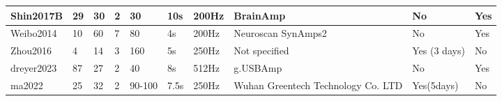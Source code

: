 \documentclass{ieeeaccess}
\begin{document}
\begin{landscape}
\begin{table}[tb]
\begin{tabularx}{\linewidth}{|p{2.5cm}|X|X|X|X|X|X|X|X|X|}
        Shin2017B\cite{shin2016open} & 29 & 30 & 2 & 30 & 10s & 200Hz & BrainAmp & No & Yes \\ \hline
        Weibo2014\cite{yi2014evaluation} & 10 & 60 & 7 & 80 & 4s & 200Hz & Neuroscan SynAmps2 & No & Yes \\ \hline
        Zhou2016\cite{zhou2016fully} & 4 & 14 & 3 & 160 & 5s & 250Hz & Not specified & Yes (3 days) & No \\ \hline
        dreyer2023\cite{dreyer2023large} & 87 & 27 & 2 & 40 & 8s & 512Hz & g.USBAmp & No & Yes \\ \hline
        \rowcolor{pink} ma2022\cite{ma2022large} & 25 & 32 & 2 & 90-100 & 7.5s & 250Hz & Wuhan Greentech Technology Co. LTD & Yes(5days) & No \\ \hline
        \end{tabularx}
        \label{tab: Comparison of existing data sets and the data sets used in this study}
    \end{table}
    \end{landscape}

    
    
    
    

    
\end{document}
